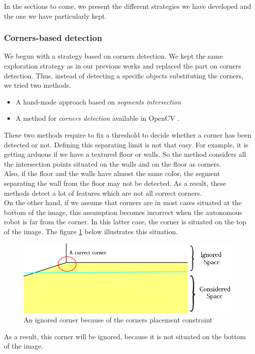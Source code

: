 \documentclass[12pt]{report}
\begin{document}
	 In the sections to come, we present the different strategies we have developed and the one we have particularly kept.
	 
	 \subsubsection{Corners-based detection}
	 
	 We begun with a strategy based on corners detection. We kept the same exploration strategy as 
in our previous works and replaced the part on corners detection. Thus, instead of detecting a specific objects substituting the corners, we tried two methods. 
\begin{itemize}
 \item A hand-made approach based on \textit{segments intersection}
 \item A method for \textit{corners detection} available in OpenCV \cite{opencv_documentation}.
\end{itemize}
These two methods require to fix a threshold to decide whether a corner has been detected or not. Defining this separating limit is not that easy. For example, it is 
getting arduous if we have a textured floor or walls. So the method considers all the intersection points situated on 
the walls and on the floor as corners.\\
	
	 Also, if the floor and the walls have almost the same color, the segment separating the wall from the floor may not be detected.
	 As a result, these methods detect a lot of features which are not all correct corners.\\	 
	 On the other hand, if we assume that corners are in most cases situated at the bottom of the image, this 
assumption becomes incorrect when the autonomous robot is far from the corner. In this latter case, the corner is 
situated on the top of the image. The figure \ref{fig:corner} below illustrates this situation.
	 	\begin{figure}[h]
	 	\begin{center}
	 		\includegraphics[scale=0.6]{res/start1_c1.png}
	 		\caption{An ignored corner because of the corners placement constraint}
	 		\label{fig:corner}
	 	\end{center}
	 \end{figure}
	As a result, this corner will be ignored, because it is not situated on the bottom of the image.
	 
\end{document}
